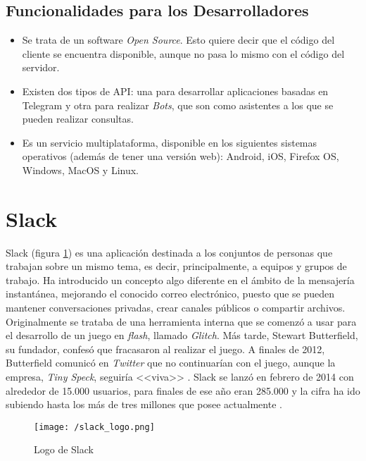 \subsection{Funcionalidades para los Desarrolladores}

\begin{itemize}
	\item Se trata de un software \textit{Open Source}. Esto quiere decir que el código del cliente se encuentra disponible, aunque no pasa lo mismo con el código del servidor.
	\item Existen dos tipos de \acs{API}: una para desarrollar aplicaciones basadas en Telegram y otra para realizar \textit{Bots}, que son como asistentes a los que se pueden realizar consultas.
	\item Es un servicio multiplataforma, disponible en los siguientes sistemas operativos (además de tener una versión web): Android, iOS, Firefox OS, Windows, MacOS y Linux.
\end{itemize}

\section{Slack}
\label{sec:slack}

Slack (figura \ref{fig:slack}) es una aplicación destinada a los conjuntos de personas que trabajan sobre un mismo tema, es decir, principalmente, a equipos y grupos de trabajo. Ha introducido un concepto algo diferente en el ámbito de la mensajería instantánea, mejorando el conocido correo electrónico, puesto que se pueden mantener conversaciones privadas, crear canales públicos o compartir archivos. Originalmente se trataba de una herramienta interna que se comenzó a usar para el desarrollo de un juego en \textit{flash}, llamado \textit{Glitch}. Más tarde, Stewart Butterfield, su fundador, confesó que fracasaron al realizar el juego. A finales de 2012, Butterfield comunicó en \textit{Twitter} que no continuarían con el juego, aunque la empresa, \textit{Tiny Speck}, seguiría <<viva>> \cite{Thomas2015}. Slack se lanzó en febrero de 2014 con alrededor de 15.000 usuarios, para finales de ese año eran 285.000 y la cifra ha ido subiendo hasta los más de tres millones que posee actualmente \cite{PyMEs2017}.

\begin{figure}[!h]
	\begin{center}
		\texttt{[image: /slack\_logo.png]}
		\caption{Logo de Slack}
		\label{fig:slack}
	\end{center}
\end{figure}

